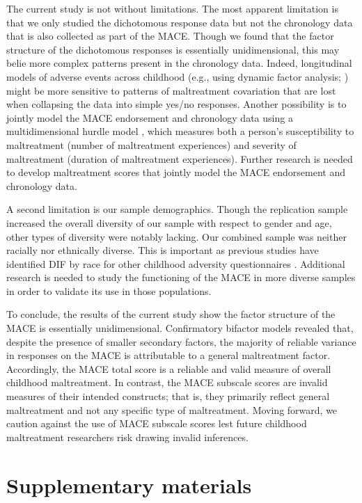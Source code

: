 \documentclass[letterpaper,man,natbib,longtable,floatsintext,12pt]{apa6}
\begin{document}
The current study is not without limitations. The most apparent limitation is that we only studied the dichotomous response data but not the chronology data that is also collected as part of the MACE. Though we found that the factor structure of the dichotomous responses is essentially unidimensional, this may belie more complex patterns present in the chronology data. Indeed, longitudinal models of adverse events across childhood (e.g., using dynamic factor analysis; \citealt{zhang2007bayesian}) might be more sensitive to patterns of maltreatment covariation that are lost when collapsing the data into simple yes/no responses. Another possibility is to jointly model the MACE endorsement and chronology data using a multidimensional hurdle model \citep{magnus2021symptom}, which measures both a person's susceptibility to maltreatment (number of maltreatment experiences) and severity of maltreatment (duration of maltreatment experiences). Further research is needed to develop maltreatment scores that jointly model the MACE endorsement and chronology data. 

A second limitation is our sample demographics. Though the replication sample increased the overall diversity of our sample with respect to gender and age, other types of diversity were notably lacking. Our combined sample was neither racially nor ethnically diverse. This is important as previous studies have identified DIF by race for other childhood adversity questionnaires \citep{rodriguez2019identification}. Additional research is needed to study the functioning of the MACE in more diverse samples in order to validate its use in those populations. 

To conclude, the results of the current study show the factor structure of the MACE is essentially unidimensional. Confirmatory bifactor models revealed that, despite the presence of smaller secondary factors, the majority of reliable variance in responses on the MACE is attributable to a general maltreatment factor. Accordingly, the MACE total score is a reliable and valid measure of overall childhood maltreatment. In contrast, the MACE subscale scores are invalid measures of their intended constructs; that is, they primarily reflect general maltreatment and not any specific type of maltreatment. Moving forward, we caution against the use of MACE subscale scores lest future childhood maltreatment researchers risk drawing invalid inferences. 



\pagebreak
\section{Supplementary materials}
\end{document}
